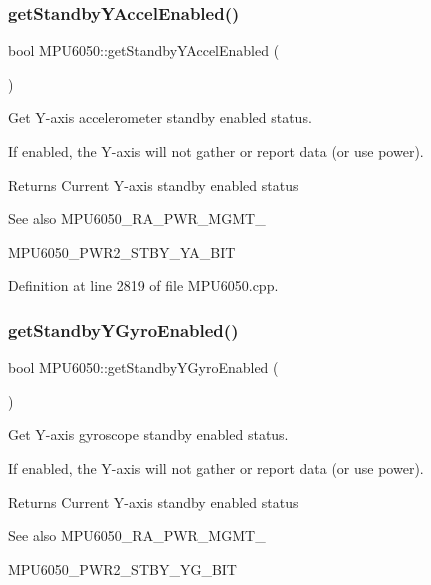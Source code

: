 \subsubsection{\texorpdfstring{getStandbyYAccelEnabled()}{getStandbyYAccelEnabled()}}
{\footnotesize\ttfamily bool M\+P\+U6050\+::get\+Standby\+Y\+Accel\+Enabled (\begin{DoxyParamCaption}{ }\end{DoxyParamCaption})}



Get Y-\/axis accelerometer standby enabled status. 

If enabled, the Y-\/axis will not gather or report data (or use power). \begin{DoxyReturn}{Returns}
Current Y-\/axis standby enabled status 
\end{DoxyReturn}
\begin{DoxySeeAlso}{See also}
M\+P\+U6050\+\_\+\+R\+A\+\_\+\+P\+W\+R\+\_\+\+M\+G\+M\+T\+\_ 

M\+P\+U6050\+\_\+\+P\+W\+R2\+\_\+\+S\+T\+B\+Y\+\_\+\+Y\+A\+\_\+\+B\+IT 
\end{DoxySeeAlso}


Definition at line 2819 of file M\+P\+U6050.\+cpp.

\mbox{\label{classMPU6050_aaad2985f8d22aec123f1e1dabcdd427a}} 
\subsubsection{\texorpdfstring{getStandbyYGyroEnabled()}{getStandbyYGyroEnabled()}}
{\footnotesize\ttfamily bool M\+P\+U6050\+::get\+Standby\+Y\+Gyro\+Enabled (\begin{DoxyParamCaption}{ }\end{DoxyParamCaption})}



Get Y-\/axis gyroscope standby enabled status. 

If enabled, the Y-\/axis will not gather or report data (or use power). \begin{DoxyReturn}{Returns}
Current Y-\/axis standby enabled status 
\end{DoxyReturn}
\begin{DoxySeeAlso}{See also}
M\+P\+U6050\+\_\+\+R\+A\+\_\+\+P\+W\+R\+\_\+\+M\+G\+M\+T\+\_ 

M\+P\+U6050\+\_\+\+P\+W\+R2\+\_\+\+S\+T\+B\+Y\+\_\+\+Y\+G\+\_\+\+B\+IT 
\end{DoxySeeAlso}


